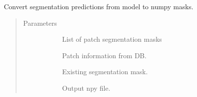 \documentclass[letterpaper,10pt,english]{sphinxmanual}
\begin{document}
\begin{fulllineitems}
\label{\detokenize{index:pathflowai.utils.segmentation_predictions2npy}}
Convert segmentation predictions from model to numpy masks.
\begin{quote}\begin{description}
\item[{Parameters}] \leavevmode\begin{description}
\item[{}] \leavevmode
List of patch segmentation masks

\item[{}] \leavevmode
Patch information from DB.

\item[{}] \leavevmode
Existing segmentation mask.

\item[{}] \leavevmode
Output npy file.

\end{description}

\end{description}\end{quote}

\end{fulllineitems}

\end{document}
